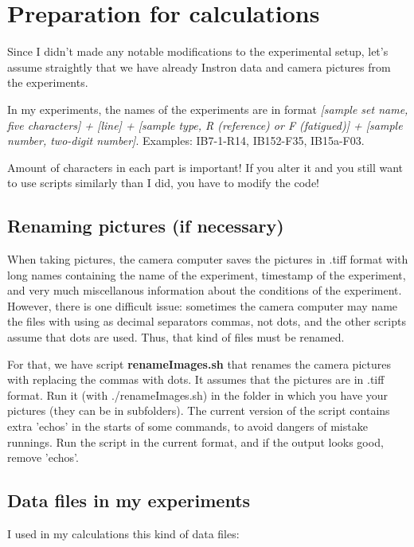 \documentclass[a4paper]{article}
\begin{document}
\section{Preparation for calculations}

Since I didn't made any notable modifications to the experimental setup, 
let's assume straightly that we have already Instron data and camera 
pictures from the experiments. 

In my experiments, the names of the experiments are in format 
\textit{[sample set name, five characters] + [line] + [sample type, 
R (reference) or F (fatigued)] + [sample number, two-digit number]}. 
Examples: IB7-1-R14, IB152-F35, IB15a-F03. 

Amount of characters in each part is important! If you alter it and 
you still want to use scripts similarly than I did, you have to 
modify the code!

\subsection{Renaming pictures (if necessary)}

When taking pictures, the camera computer saves the pictures in 
.tiff format with long names containing the name of the experiment, 
timestamp of the experiment, and very much miscellanous information 
about the conditions of the experiment. However, there is one difficult 
issue: sometimes the camera computer may name the files with using as 
decimal separators commas, not dots, and the other scripts assume that 
dots are used. Thus, that kind of files must be renamed.

For that, we have script \textbf{renameImages.sh} that renames the camera 
pictures with replacing the commas with dots. It assumes that the pictures 
are in .tiff format. Run it (with \textsf{./renameImages.sh}) in the 
folder in which you have your pictures (they can be in subfolders). The 
current version of the script contains extra 'echos' in the starts of some 
commands, to avoid dangers of mistake runnings. Run the script in the 
current format, and if the output looks good, remove 'echos'.

\subsection{Data files in my experiments}

I used in my calculations this kind of data files:
\end{document}
